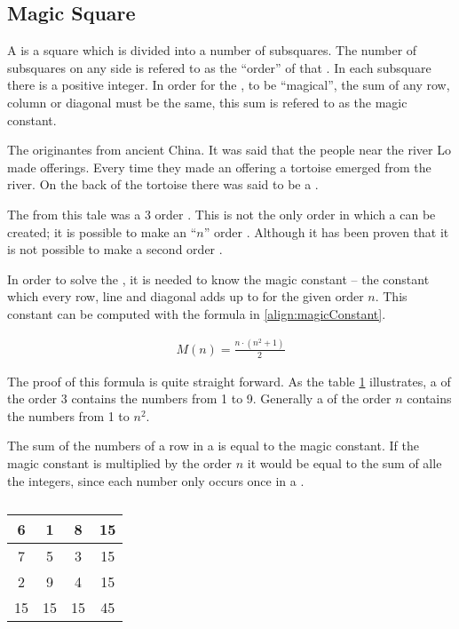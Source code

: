 \subsection{Magic Square}
\label{sec:magicSquare}
A \msquare{} is a square which is divided into a number of subsquares. The number of subsquares on any side is refered to as the ``order'' of that \msquare{}. In each subsquare there is a positive integer. In order for the \msquare{}, to be ``magical'', the sum of any row, column or diagonal must be the same, this sum is refered to as the magic constant.

The \msquare{}\cite{aiden06} originantes from ancient China. It was said that the people near the river Lo made offerings. Every time they made an offering a tortoise emerged from the river. On the back of the tortoise there was said to be a \msquare{}.

The \msquare{} from this tale was a 3 order \msquare{}. This is not the only order in which a \msquare{} can be created; it is possible to make an ``$n$'' order \msquare{}. Although it has been proven that it is not possible to make a second order \msquare{}.

In order to solve the \msquare{}, it is needed to know the magic constant -- the constant which every row, line and diagonal adds up to for the given order $n$. This constant can be computed with the formula in \ref{align:magicConstant}.

\begin{align}
\label{align:magicConstant}
	M(n) = \frac{n \cdot (n^2+1)}{2}
\end{align}

The proof of this formula is quite straight forward. As the table \ref{tab:magicSquareOrder3} illustrates, a \msquare{} of the order 3 contains the numbers from 1 to 9. Generally a \msquare{} of the order $n$ contains the numbers from 1 to $n^2$.

The sum of the numbers of a row in a \msquare{} is equal to the magic constant. If the magic constant is multiplied by the order $n$ it would be equal to the sum of alle the integers, since each number only occurs once in a \msquare{}.

\renewcommand{\arraystretch}{1.3}
\begin{table}[h]
	\centering
		\begin{tabular}{|c|c|c |@{\vrules}| c|}
			\hline
			6&1&8&15 \\
			\hline
			7&5&3&15 \\
			\hline
			2&9&4&15 \\
			\noalign{\hrules}
			15&15&15&45 \\
			\hline
		\end{tabular}
	\caption{}
	\label{tab:magicSquareOrder3}
\end{table}

